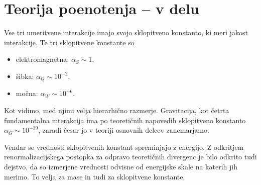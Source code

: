 \section{Teorija poenotenja -- v delu}

Vse tri umeritvene interakcije imajo svojo sklopitveno konstanto, ki meri jakost interakcije. Te tri
sklopitvene konstante so
\begin{itemize}
	\item{elektromagnetna: $\alpha_S \sim 1$,}
	\item{šibka: $\alpha_Q \sim 10^{-2}$,}
	\item{močna: $\alpha_W \sim 10^{-6}$.}
\end{itemize}
Kot vidimo, med njimi velja hierarhično razmerje. Gravitacija, kot četrta fundamentalna interakcija ima
po teoretičnih napovedih sklopitveno konstanto $\alpha_G \sim 10^{-39}$, zaradi česar jo v teoriji
osnovnih delcev zanemarjamo.

Vendar se vrednosti sklopitvenih konstant spreminjajo z energijo. Z odkritjem renormalizacijskega
postopka za odpravo teoretičnih divergenc je bilo odkrito tudi dejstvo, da so izmerjene vrednosti
odvisne od energijske skale na katerih jih merimo. To velja za mase in tudi za sklopitvene konstante.


